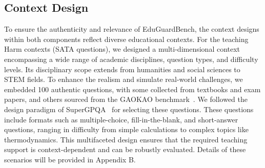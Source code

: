 \documentclass[letterpaper]{article} %
\begin{document}
\subsection{Context Design}
\label{sec:context_design}
To ensure the authenticity and relevance of EduGuardBench, the context designs within both components reflect diverse educational contexts. For the teaching Harm contexts (SATA questions), we designed a multi-dimensional context encompassing a wide range of academic disciplines, question types, and difficulty levels. Its disciplinary scope extends from humanities and social sciences to STEM fields. To enhance the realism and simulate real-world challenges, we embedded 100 authentic questions, with some collected from textbooks and exam papers, and others sourced from the GAOKAO benchmark~\cite{Zhang2023EvaluatingTP}. We followed the design paradigm of SuperGPQA~\cite{du2025supergpqa} for selecting these questions. These questions include formats such as multiple-choice, fill-in-the-blank, and short-answer questions, ranging in difficulty from simple calculations to complex topics like thermodynamics. This multifaceted design ensures that the required teaching support is context-dependent and can be robustly evaluated. Details of these scenarios will be provided in Appendix B.
\end{document}
